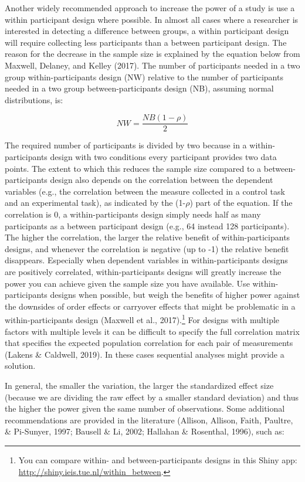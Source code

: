 \documentclass[
  english,
  ,jou, a4paper,floatsintext]{apa6}
\begin{document}
Another widely recommended approach to increase the power of a study is use a within participant design where possible. In almost all cases where a researcher is interested in detecting a difference between groups, a within participant design will require collecting less participants than a between participant design. The reason for the decrease in the sample size is explained by the equation below from Maxwell, Delaney, and Kelley (2017). The number of participants needed in a two group within-participants design (NW) relative to the number of participants needed in a two group between-participants design (NB), assuming normal distributions, is:

\[NW = \frac{NB (1-\rho)}{2}\]

The required number of participants is divided by two because in a within-participants design with two conditions every participant provides two data points. The extent to which this reduces the sample size compared to a between-participants design also depends on the correlation between the dependent variables (e.g., the correlation between the measure collected in a control task and an experimental task), as indicated by the (1-\(\rho\)) part of the equation. If the correlation is 0, a within-participants design simply needs half as many participants as a between participant design (e.g., 64 instead 128 participants). The higher the correlation, the larger the relative benefit of within-participants designs, and whenever the correlation is negative (up to -1) the relative benefit disappears. Especially when dependent variables in within-participants designs are positively correlated, within-participants designs will greatly increase the power you can achieve given the sample size you have available. Use within-participants designs when possible, but weigh the benefits of higher power against the downsides of order effects or carryover effects that might be problematic in a within-participants design (Maxwell et al., 2017).\footnote{You can compare within- and between-participants designs in this Shiny app: \url{http://shiny.ieis.tue.nl/within_between}.} For designs with multiple factors with multiple levels it can be difficult to specify the full correlation matrix that specifies the expected population correlation for each pair of measurements (Lakens \& Caldwell, 2019). In these cases sequential analyses might provide a solution.

In general, the smaller the variation, the larger the standardized effect size (because we are dividing the raw effect by a smaller standard deviation) and thus the higher the power given the same number of observations. Some additional recommendations are provided in the literature (Allison, Allison, Faith, Paultre, \& Pi-Sunyer, 1997; Bausell \& Li, 2002; Hallahan \& Rosenthal, 1996), such as:
\end{document}

